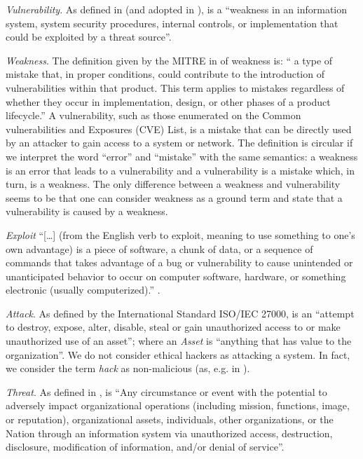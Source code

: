 \documentclass[runningheads]{llncs}
\begin{document}
\emph{Vulnerability}.
	As defined in \autocite{cnssi20104009}
	(and adopted in \autocite{nist2013800-53}), is a ``weakness in an
	information system, system security procedures, internal
	controls, or implementation that could be exploited by a threat
	source''.

\emph{Weakness}. The definition given by the MITRE in
	\autocite{MITRE2020CWEweakness} of weakness is: `` a type of
	mistake that, in proper conditions, could contribute to the
	introduction of vulnerabilities within that product. This term
	applies to mistakes regardless of whether they occur in
	implementation, design, or other phases of a product
	lifecycle.'' A vulnerability, such as those enumerated on the
	Common vulnerabilities and Exposures (CVE) List, is a mistake
	that can be directly used by an attacker to gain access to a
	system or network.  The definition is circular if we interpret
	the word ``error'' and ``mistake'' with the same semantics: a
	weakness is an error that leads to a vulnerability and a
	vulnerability is a mistake which, in turn, is a weakness. The
	only difference between a weakness and vulnerability seems to
	be that one can consider weakness as a ground term and state
	that a vulnerability is caused by a weakness.

\emph{Exploit} ``[\ldots]
	(from the English verb to exploit, meaning to use something to
	one’s own advantage) is a piece of software, a chunk of data,
	or a sequence of commands that takes advantage of a bug or
	vulnerability to cause unintended or unanticipated behavior to
	occur on computer software, hardware, or something electronic
	(usually computerized).'' \autocite{wiki-exploit}.

\emph{Attack}. As defined by the International Standard
	ISO/IEC 27000, is an ``attempt to destroy, expose, alter,
	disable, steal or gain unauthorized access to or make
	unauthorized use of an asset''; where an \emph{Asset} is
	``anything that has value to the organization''.
	We do not consider ethical hackers as attacking a system. 
	In fact, we consider the term \emph{hack} as
	non-malicious (as, e.g. in \autocite{Stallman2002hacker}).
  
\emph{Threat}. As defined in \autocite{cnssi20104009}, is ``Any
	circumstance or event with the potential to adversely impact
	organizational operations (including mission, functions, image,
	or reputation), organizational assets, individuals, other
	organizations, or the Nation through an information system via
	unauthorized access, destruction, disclosure, modification of
	information, and/or denial of service''.
\end{document}
